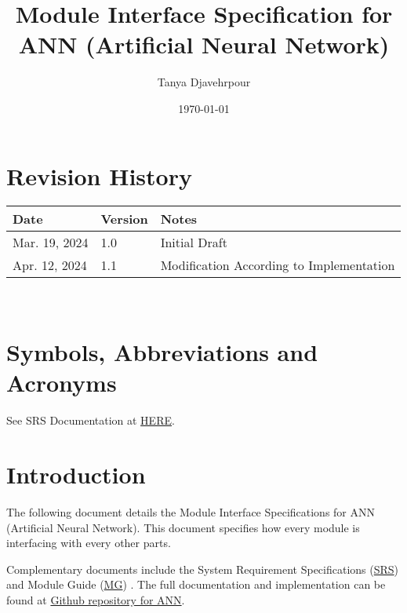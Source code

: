 \documentclass[12pt, titlepage]{article}
\begin{document}
\title{Module Interface Specification for ANN (Artificial Neural Network)}

\author{Tanya Djavehrpour}

\date{\today}

\maketitle


\section{Revision History}

\begin{tabularx}{\textwidth}{p{3cm}p{2cm}X}
\toprule {\bf Date} & {\bf Version} & {\bf Notes}\\
\midrule
Mar. 19, 2024 & 1.0 & Initial Draft\\
Apr. 12, 2024 & 1.1 & Modification According to Implementation\\
\bottomrule
\end{tabularx}

~\newpage

\section{Symbols, Abbreviations and Acronyms}

See SRS Documentation \cite{SRS} at \href{https://github.com/tanya-jp/ANN-CAS741/blob/main/docs/SRS/SRS.pdf}{HERE}.

\newpage

\tableofcontents

\newpage


\section{Introduction}

The following document details the Module Interface Specifications for
ANN (Artificial Neural Network). This document specifies how every module 
is interfacing with every other parts.

Complementary documents include the System Requirement Specifications 
(\href{https://github.com/tanya-jp/ANN-CAS741/blob/main/docs/SRS/SRS.pdf}{SRS}) \cite{SRS}
and Module Guide (\href{https://github.com/tanya-jp/ANN-CAS741/blob/main/docs/Design/SoftArchitecture/MG.pdf}{MG}) \cite{MG}.  
The full documentation and implementation can be
found at \href{https://github.com/tanya-jp/ANN-CAS741/tree/main}{Github repository for ANN}.
\end{document}
